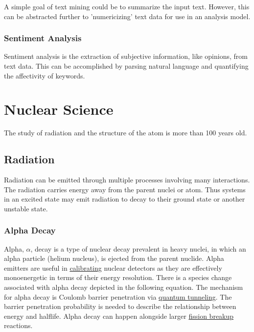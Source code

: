\documentclass[12pt]{article}
\begin{document}
\begin{doublespacing}
A simple goal of text mining could be to summarize the input text.
However, this can be abstracted further to 'numericizing' text data for use in an analysis model.

\subsubsection{Sentiment Analysis}
Sentiment analysis is the extraction of subjective information, like opinions, from text data.
This can be accomplished by parsing natural language and quantifying the affectivity of keywords.


\pagebreak
\section{Nuclear Science}
The study of radiation and the structure of the atom is more than 100 years old.

\subsection{Radiation}
Radiation can be emitted through multiple processes involving many interactions. The radiation carries energy away from the parent nuclei or atom. Thus systems in an excited state may emit radiation to decay to their ground state or another unstable state. 

\subsubsection{Alpha Decay}
Alpha, $\alpha$, decay is a type of nuclear decay prevalent in heavy nuclei, in which an alpha particle (helium nucleus), is ejected from the parent nuclide. Alpha emitters are useful in \href{http://cs.smu.ca/~andrew/files/ugthesis/SMU-Thesis-v.1.0.1.pdf}{calibrating} nuclear detectors as they are effectively monoenergetic in terms of their energy resolution. There is a species change associated with alpha decay depicted in the following equation.
The mechanism for alpha decay is Coulomb barrier penetration via \href{https://en.wikipedia.org/wiki/Quantum_tunneling}{quantum tunneling}. The barrier penetration probability is needed to describe the relationship between energy and halflife. Alpha decay can happen alongside larger \href{https://en.wikipedia.org/wiki/Nuclear_fission}{fission breakup} reactions.


\end{doublespacing}
\end{document}
